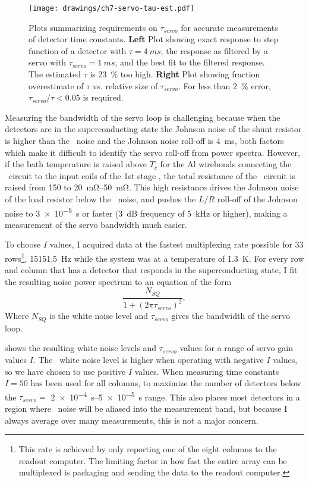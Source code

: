 \begin{figure*}
\texttt{[image: drawings/ch7-servo-tau-est.pdf]}
\caption{Plots summarizing requirements on $\tau_{servo}$ for accurate measurements of detector time constants.
\textbf{Left} Plot showing exact response to step function of a detector with $\tau = \SI{4}{ms}$, the response as filtered by a servo with $\tau_{servo} = \SI{1}{ms}$, and the best fit to the filtered response. The estimated $\tau$ is \SI{23}{\percent} too high.
\textbf{Right} Plot showing fraction overestimate of $\tau$ vs. relative size of $\tau_{servo}$.
For less than \SI{2}{\percent} error, $\tau_{servo}/\tau < \num{0.05}$ is required.
}
\label{fig:ch7-servo-tau-est}
\end{figure*}

Measuring the bandwidth of the servo loop is challenging because when the detectors are in the superconducting state the Johnson noise of the shunt resistor is higher than the \SQUID\ noise and the Johnson noise roll-off is \abt \SI{4}{\ms}, both factors which make it difficult to identify the servo roll-off from power spectra.
However, if the bath temperature is raised above $T_c$ for the Al wirebonds connecting the \TES\ circuit to the input coils of the 1st stage \SQUIDs, the total resistance of the \TES\ circuit is raised from \SI{150}{\uohm} to \SIrange{20}{50}{\mohm}.
This high resistance drives the Johnson noise of the load resistor below the \SQUID\ noise, and pushes the $L/R$ roll-off of the Johnson noise to \SI{3e-5}{s} or faster (\SI{3}{\dB} frequency of \SI{5}{\kilo\Hz} or higher), making a measurement of the servo bandwidth much easier.

To choose $I$ values, I acquired data at the fastest multiplexing rate possible for 33 rows\footnote{This rate is achieved by only reporting one of the eight columns to the readout computer. The limiting factor in how fast the entire array can be multiplexed is packaging and sending the data to the readout computer.}, \SI{15151.5}{Hz} while the system was at a temperature of \SI{1.3}{\K}.
For every row and column that has a detector that responds in the superconducting state, I fit the resulting noise power spectrum to an equation of the form
\begin{equation}
  \frac{N_{SQ}}{1 + (2 \pi \tau_{servo})^2},
\end{equation}
Where $N_{SQ}$ is the white noise level and $\tau_{servo}$ gives the bandwidth of the servo loop.

 shows the resulting white noise levels and $\tau_{servo}$ values for a range of servo gain values $I$.
The \SQUID\ white noise level is higher when operating with negative $I$ values, so we have chosen to use positive $I$ values.
When measuring time constants $I=50$ has been used for all columns, to maximize the number of detectors below the $\tau_{servo} =$ \SIrange{2e-4}{5e-5}{s} range.
This also places most detectors in a region where \SQUID\ noise will be aliased into the measurement band, but because I always average over many measurements, this is not a major concern.

